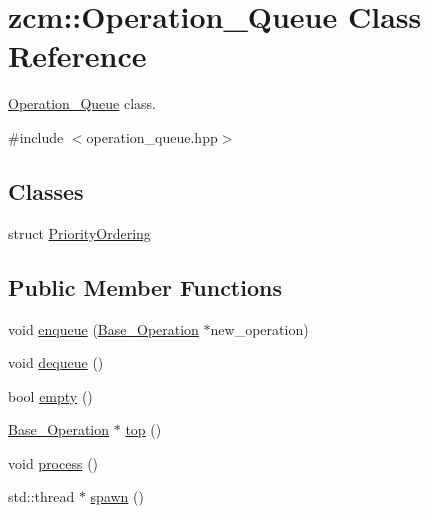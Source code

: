 \hypertarget{classzcm_1_1Operation__Queue}{}\section{zcm\+:\+:Operation\+\_\+\+Queue Class Reference}
\label{classzcm_1_1Operation__Queue}


\hyperlink{classzcm_1_1Operation__Queue}{Operation\+\_\+\+Queue} class.  




{\ttfamily \#include $<$operation\+\_\+queue.\+hpp$>$}

\subsection*{Classes}
\begin{DoxyCompactItemize}
\item 
struct \hyperlink{structzcm_1_1Operation__Queue_1_1PriorityOrdering}{Priority\+Ordering}
\end{DoxyCompactItemize}
\subsection*{Public Member Functions}
\begin{DoxyCompactItemize}
\item 
void \hyperlink{classzcm_1_1Operation__Queue_a22229dc65dd7a4dafcd9880e467c7259}{enqueue} (\hyperlink{classzcm_1_1Base__Operation}{Base\+\_\+\+Operation} $\ast$new\+\_\+operation)
\item 
void \hyperlink{classzcm_1_1Operation__Queue_a2f2e1d6674f1b148eb75320eca01c4b7}{dequeue} ()
\item 
bool \hyperlink{classzcm_1_1Operation__Queue_aa2ace1c0c0483b01a391e54e31281e1a}{empty} ()
\item 
\hyperlink{classzcm_1_1Base__Operation}{Base\+\_\+\+Operation} $\ast$ \hyperlink{classzcm_1_1Operation__Queue_aca92acffae896456388a6b74c24a1d68}{top} ()
\item 
void \hyperlink{classzcm_1_1Operation__Queue_a7a1b4578e27c24f6ce126cbd9b76e2c8}{process} ()
\item 
std\+::thread $\ast$ \hyperlink{classzcm_1_1Operation__Queue_a7ee35bb38b4c40770043674e61a344e2}{spawn} ()
\end{DoxyCompactItemize}
